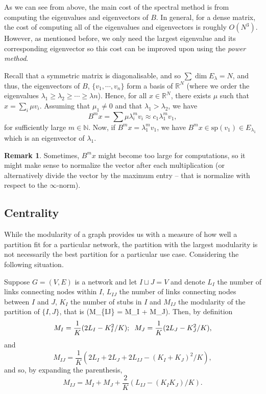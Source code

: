 \documentclass[
]{article}
\theoremstyle{definition}
\newtheorem*{remark}{Remark}
\theoremstyle{definition}
\begin{document}
As we can see from above, the main cost of the spectral method is from
computing the eigenvalues and eigenvectors of \(B\). In general, for a
dense matrix, the cost of computing all of the eigenvalues and
eigenvectors is roughly \(O(N^3)\). However, as mentioned before, we
only need the largest eigenvalue and its corresponding eigenvector so
this cost can be improved upon using the \emph{power method}.

Recall that a symmetric matrix is diagonalisable, and so
\(\sum \dim E_\lambda = N\), and thus, the eigenvectors of \(B\),
\(\{v_1, \cdots, v_n\}\) form a basis of \(\mathbb{R}^N\) (where we
order the eigenvalues
\(\lambda_1 \ge \lambda_2 \ge \cdots \ge \lambda n\)). Hence, for all
\(x \in \mathbb{R}^N\), there exists \(\mu\) such that
\(x = \sum_i \mu v_i\). Assuming that \(\mu_1 \neq 0\) and that
\(\lambda_1 > \lambda_2\), we have
\[B^m x = \sum \mu \lambda_i^m v_i \approx c_1 \lambda_1^m v_1,\] for
sufficiently large \(m \in \mathbb{N}\). Now, if
\(B^m x = \lambda_1^m v_1\), we have
\(B^m x \in \text{sp}(v_1) \in E_{\lambda_1}\) which is an eigenvector
of \(\lambda_1\).

\begin{remark}
  Sometimes, \(B^m x\) might become too large for computations, so it might make 
  sense to normalize the vector after each multiplication (or alternatively divide 
  the vector by the maximum entry -- that is normalize with respect to the 
  \(\infty\)-norm).
\end{remark}

\hypertarget{centrality}{%
\subsection{Centrality}\label{centrality}}

While the modularity of a graph provides us with a measure of how well a
partition fit for a particular network, the partition with the largest
modularity is not necessarily the best partition for a particular use
case. Considering the following situation.

Suppose \(G = (V, E)\) is a network and let \(I \sqcup J = V\) and
denote \(L_I\) the number of links connecting nodes within \(I\),
\(L_{IJ}\) the number of links connecting nodes between \(I\) and \(J\),
\(K_I\) the number of stubs in \(I\) and \(M_{IJ}\) the modularity of
the partition of \(\{I, J\}\), that is (M\_\{IJ\} = M\_I + M\_J). Then,
by definition
\[M_I = \frac{1}{K}(2L_I - K_I^2 / K) ; \hspace{2mm} M_J = \frac{1}{K}(2L_J - K_J^2 / K),\]
and
\[M_{IJ} = \frac{1}{K} (2L_I + 2L_J + 2L_{IJ} - (K_I + K_J)^2 / K),\]
and so, by expanding the parenthesis,
\[M_{IJ} = M_I + M_J + \frac{2}{K}(L_{IJ} - (K_IK_J) / K).\]
\end{document}
